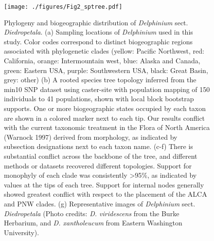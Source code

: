 \documentclass[11pt]{article}
\begin{document}
\begin{figure}[t!]
	\centering
	\texttt{[image: ./figures/Fig2\_sptree.pdf]}
	\caption{
		Phylogeny and biogeographic distribution of \emph{Delphinium} sect. \emph{Diedropetala}.
		(a) Sampling locations of \emph{Delphinium} used in this study.
		Color codes correspond to distinct biogeographic regions associated with phylogenetic clades
		(yellow: Pacific Northwest,
		 red: California,
		 orange: Intermountain west,
		 blue: Alaska and Canada,
		 green: Eastern USA,			
		 purple: Southwestern USA,
		 black: Great Basin,
		 grey: other)
		(b) A rooted species tree topology inferred from the min10 SNP dataset using caster-site with 
		population mapping of 150 individuals to 41 populations, shown with local block bootstrap supports.
		One or more biogeographic states occupied by each taxon are shown in a colored marker next to each tip.
		Our results conflict with the current taxonomic treatment in the Flora of North America (Warnock 1997)
		derived from morphology, as indicated by subsection designations next to each taxon name.
		(c-f) There is substantial conflict across the backbone of the tree, and different methods or
		datasets recovered different topologies. 
		Support for monophyly of each clade was consistently >95\%, as indicated by values at the tips
		of each tree. Support for internal nodes generally showed greatest conflict with respect to the
		placement of the ALCA and PNW clades.
		(g) Representative images of \emph{Delphinium} sect. \emph{Diedropetala} 
		(Photo credits: \emph{D. viridescens} from the Burke Herbarium, 
		and \emph{D. xantholeucum} from Eastern Washington University).
	}
	\label{fig:sptree}
\end{figure}
\end{document}
